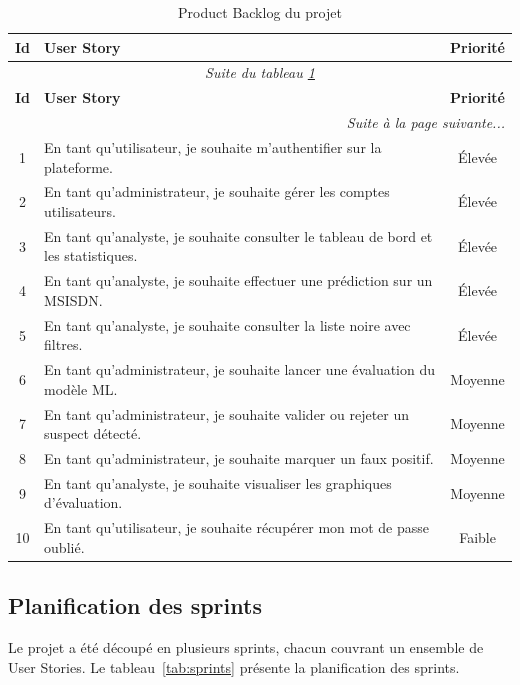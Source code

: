 \documentclass[12pt, oneside, a4paper]{report}
\begin{document}
\renewcommand{\arraystretch}{1.3}
\begin{center}
\begin{longtable}{|c|p{9cm}|c|}
\caption{Product Backlog du projet} \label{tab:product-backlog} \\
\hline
\textbf{Id} & \textbf{User Story} & \textbf{Priorité} \\
\hline
\endfirsthead

\multicolumn{3}{c}{\textit{Suite du tableau \ref{tab:product-backlog}}} \\
\hline
\textbf{Id} & \textbf{User Story} & \textbf{Priorité} \\
\hline
\endhead

\hline
\multicolumn{3}{r}{\textit{Suite à la page suivante...}} \\
\endfoot

\hline
\endlastfoot

1 & En tant qu'utilisateur, je souhaite m'authentifier sur la plateforme. & Élevée \\
\hline
2 & En tant qu'administrateur, je souhaite gérer les comptes utilisateurs. & Élevée \\
\hline
3 & En tant qu'analyste, je souhaite consulter le tableau de bord et les statistiques. & Élevée \\
\hline
4 & En tant qu'analyste, je souhaite effectuer une prédiction sur un MSISDN. & Élevée \\
\hline
5 & En tant qu'analyste, je souhaite consulter la liste noire avec filtres. & Élevée \\
\hline
6 & En tant qu'administrateur, je souhaite lancer une évaluation du modèle ML. & Moyenne \\
\hline
7 & En tant qu'administrateur, je souhaite valider ou rejeter un suspect détecté. & Moyenne \\
\hline
8 & En tant qu'administrateur, je souhaite marquer un faux positif. & Moyenne \\
\hline
9 & En tant qu'analyste, je souhaite visualiser les graphiques d'évaluation. & Moyenne \\
\hline
10 & En tant qu'utilisateur, je souhaite récupérer mon mot de passe oublié. & Faible \\
\hline
\end{longtable}
\end{center}
\subsection{Planification des sprints}
Le projet a été découpé en plusieurs sprints, chacun couvrant un ensemble de User Stories. Le tableau~\ref{tab:sprints} présente la planification des sprints.
\end{document}

